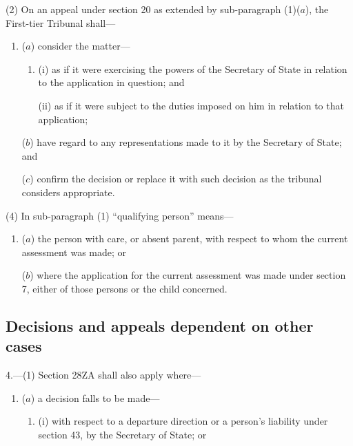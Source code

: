 \documentclass[a4paper]{article}
\begin{document}
{(2) On an appeal under section 20 as extended by sub-paragraph (1)($a$), the First-tier Tribunal shall---
\begin{enumerate}\item[]
($a$) consider the matter---
\begin{enumerate}\item[]
(i) as if it were exercising the powers of the Secretary of State in relation to the application in question; and

(ii) as if it were subject to the duties imposed on him in relation to that application;
\end{enumerate}

($b$) have regard to any representations made to it by the Secretary of State; and

($c$) confirm the decision or replace it with such decision as the tribunal considers appropriate.
\end{enumerate}


(4) In sub-paragraph (1) “qualifying person” means---
\begin{enumerate}\item[]
($a$) the person with care, or absent parent, with respect to whom the current assessment was made; or

($b$) where the application for the current assessment was made under section 7, either of those persons or the child concerned.
\end{enumerate}


\subsection*{Decisions and appeals dependent on other cases}

4.---(1) Section 28ZA shall also apply where---
\begin{enumerate}\item[]
($a$) a decision falls to be made—
\begin{enumerate}\item[]
(i) with respect to a departure direction
 or a person’s liability under section 43, by the Secretary of State; or


\end{enumerate}
\end{enumerate}}
\end{document}
